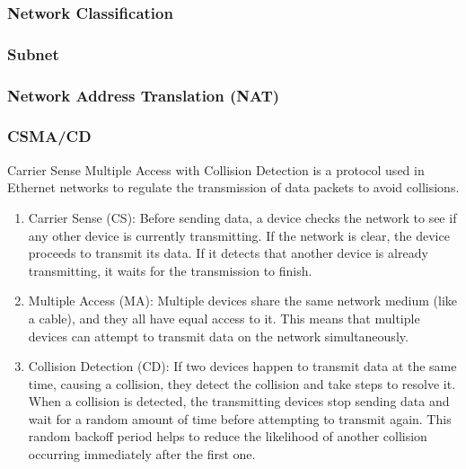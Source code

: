 \documentclass[11pt]{article}
\begin{document}
\subsubsection{Network Classification}

\subsubsection{Subnet}

\subsubsection{Network Address Translation (NAT)}

\subsubsection{CSMA/CD}

Carrier Sense Multiple Access with Collision Detection is a protocol used in
Ethernet networks to regulate the transmission of data packets to avoid
collisions.\cite{wiki:csmacd}

\begin{enumerate}
    \item Carrier Sense (CS): Before sending data, a device checks the network
          to see if any other device is currently transmitting. If the network
          is clear, the device proceeds to transmit its data. If it detects that
          another device is already transmitting, it waits for the transmission
          to finish.
    \item Multiple Access (MA): Multiple devices share the same network medium
          (like a cable), and they all have equal access to it. This means that
          multiple devices can attempt to transmit data on the network
          simultaneously.
    \item Collision Detection (CD): If two devices happen to transmit data at
          the same time, causing a collision, they detect the collision and take
          steps to resolve it. When a collision is detected, the transmitting
          devices stop sending data and wait for a random amount of time before
          attempting to transmit again. This random backoff period helps to
          reduce the likelihood of another collision occurring immediately after
          the first one.
\end{enumerate}

\newpage
\printbibliography
\end{document}
